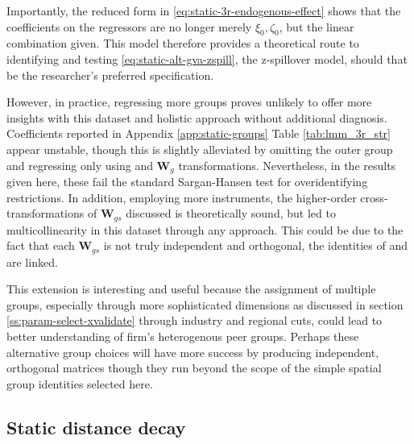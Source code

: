 Importantly, the reduced form in \eqref{eq:static-3r-endogenous-effect}
shows that the coefficients on the  regressors
are no longer merely $\xi_0, \zeta_0$, but the linear combination given.
This model therefore provides a theoretical route to identifying
and testing \eqref{eq:static-alt-gva-zspill}, the z-spillover model,
should that be the researcher's preferred specification.
\par
However, in practice, regressing more groups
proves unlikely to offer more insights with this dataset and holistic approach
without additional diagnosis.
Coefficients reported in Appendix \ref{app:static-groups} Table \ref{tab:lmm_3r_str}
appear unstable, though this is slightly alleviated by omitting the outer 
group and regressing only using  and  $\mathbf W_{g}$ transformations.
Nevertheless, in the results given here,
these fail the standard Sargan-Hansen test for overidentifying restrictions.
In addition, employing more instruments, the higher-order cross-transformations of $\mathbf W_{gs}$
discussed is theoretically sound, but led to multicollinearity in this dataset
through any approach. This could be due to the fact that each $\mathbf W_{gs}$
is not truly independent and orthogonal, the identities of  and  are linked.
\par
This extension is interesting and useful because the assignment of multiple groups,
especially through more sophisticated dimensions as discussed in section \ref{ss:param-select-xvalidate}
through industry and regional cuts,
could lead to better understanding of firm's heterogenous peer groups.
Perhaps these alternative group choices will have more success
by producing independent, orthogonal matrices
though they run beyond the scope of the simple spatial group identities
selected here.

\newpage
\subsection{Static distance decay}
\label{ss:model-dd}

